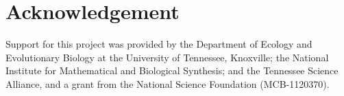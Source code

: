 
\section*{Acknowledgement}

Support for this project
was provided by the Department of Ecology and Evolutionary Biology at the
University of Tennessee, Knoxville; the National Institute for Mathematical
and Biological Synthesis; and the Tennessee Science Alliance, and a grant from
the National Science Foundation (MCB-1120370).
